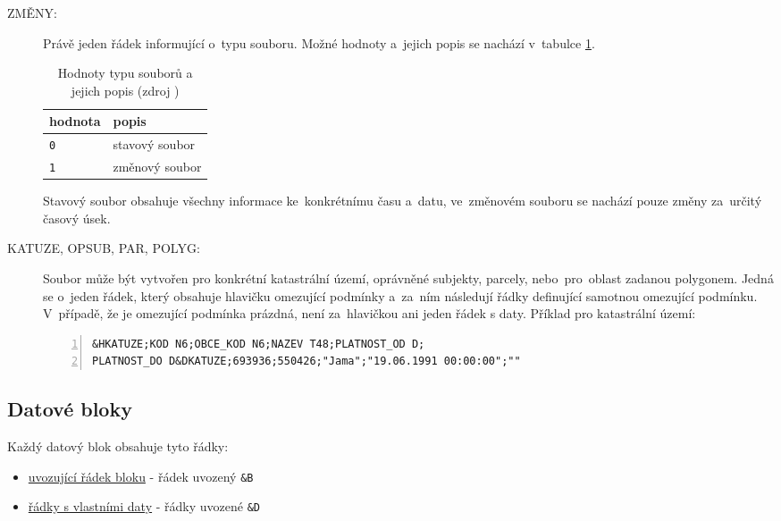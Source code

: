 \begin{description}
	\item[ZMĚNY:] Právě jeden řádek informující o~typu souboru. Možné hodnoty a~jejich popis se nachází v~tabulce \ref{tab:zmeny}.

    \begin{table}[H]
        \begin{tabular}{|l|l|}
            \hline
             hodnota & popis \\
            \hline
            \hline
             \texttt{0} & stavový soubor \\ \hline
             \texttt{1} & změnový soubor \\
             \hline
        \end{tabular}
        \centering
        \caption[Hodnoty typu souborů a~jejich popis]{Hodnoty typu souborů a jejich popis (zdroj \citep{struktura_vfk})}
        \label{tab:zmeny}
    \end{table}

Stavový soubor obsahuje všechny informace ke~konkrétnímu času a~datu, ve~změnovém souboru se nachází pouze změny za~určitý časový úsek.

	\item[KATUZE, OPSUB, PAR, POLYG:] Soubor  může být vytvořen pro konkrétní katastrální území, oprávněné subjekty, parcely, nebo~pro~oblast zadanou polygonem. Jedná se o~jeden řádek, který obsahuje hlavičku omezující podmínky a~za~ním následují řádky definující samotnou omezující podmínku. V~případě, že je omezující podmínka prázdná, není za~hlavičkou ani jeden řádek s daty. Příklad pro katastrální území:

\begin{lstlisting}[basicstyle=\footnotesize\ttfamily, backgroundcolor = \color{light-gray},  numbers=left]
&HKATUZE;KOD N6;OBCE_KOD N6;NAZEV T48;PLATNOST_OD D;
PLATNOST_DO D&DKATUZE;693936;550426;"Jama";"19.06.1991 00:00:00";""
 \end{lstlisting}

\end{description}

\subsection{Datové bloky}
\label{datove_bloky}

Každý datový blok obsahuje tyto řádky:
	\begin{itemize}[leftmargin=1.5cm, noitemsep]
		\item \underline{uvozující řádek bloku} - řádek uvozený \texttt{\&B}
		\item \underline{řádky s vlastními daty} - řádky uvozené \texttt{\&D}
	\end{itemize}

